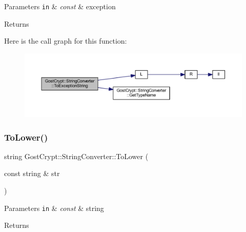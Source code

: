 \begin{DoxyParams}[1]{Parameters}
\mbox{\tt in}  & {\em const} & exception \\
\hline
\end{DoxyParams}
\begin{DoxyReturn}{Returns}

\end{DoxyReturn}
Here is the call graph for this function\+:
\nopagebreak
\begin{figure}[H]
\begin{center}
\leavevmode
\includegraphics[width=350pt]{class_gost_crypt_1_1_string_converter_a3ffac80d302898c47b5eeccbc4b5b424_cgraph}
\end{center}
\end{figure}
\mbox{\label{class_gost_crypt_1_1_string_converter_ab3981bf6da41d9e6785b8fd02cda2d9e}} 
\subsubsection{\texorpdfstring{To\+Lower()}{ToLower()}}
{\footnotesize\ttfamily string Gost\+Crypt\+::\+String\+Converter\+::\+To\+Lower (\begin{DoxyParamCaption}\item[{const string \&}]{str }\end{DoxyParamCaption})\hspace{0.3cm}{\ttfamily [static]}}


\begin{DoxyParams}[1]{Parameters}
\mbox{\tt in}  & {\em const} & string \\
\hline
\end{DoxyParams}
\begin{DoxyReturn}{Returns}

\end{DoxyReturn}
\mbox{\label{class_gost_crypt_1_1_string_converter_a95c318badff98d1c3902e5b375b4fd43}} 
